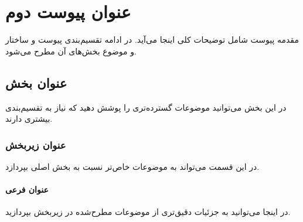 \chapter{عنوان پیوست دوم}
مقدمه پیوست شامل توضیحات کلی اینجا می‌آید. در ادامه تقسیم‌بندی پیوست و ساختار و موضوع بخش‌های آن مطرح می‌شود.


\section{عنوان بخش}
در این بخش می‌توانید موضوعات گسترده‌تری را پوشش دهید که نیاز به تقسیم‌بندی بیشتری دارند.


\subsection{عنوان زیربخش}
در این قسمت می‌تواند به موضوعات خاص‌تر نسبت به بخش اصلی بپردازد.


\subsubsection{عنوان فرعی}
در اینجا می‌توانید به جزئیات دقیق‌تری از موضوعات مطرح‌شده در زیربخش بپردازید.

